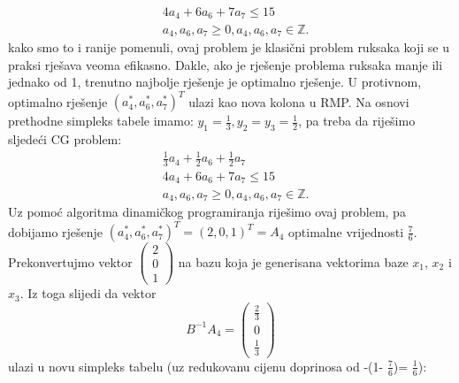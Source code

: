 \documentclass[a4paper, utf8, 11pt, colorlinks]{book}
\begin{document}
\begin{align}
   &	4 a_4 + 6 a_6 + 7 a_7 \leq 15 \\
   &	a_4, a_6, a_7 \geq 0, a_4, a_6, a_7 \in \mathbb{Z}.
\end{align}
kako smo to i ranije pomenuli, ovaj problem je klasični problem ruksaka koji se u praksi rješava veoma efikasno. Dakle, ako je rješenje problema ruksaka manje ili jednako od 1, trenutno najbolje rješenje je optimalno rješenje. U protivnom, optimalno rješenje $(a_4^*, a_6^*, a_7^*)^T$ ulazi kao nova kolona u RMP. Na osnovi prethodne simpleks tabele imamo: $y_1 = \frac{1}{3}, y_2 = y_3 = \frac{1}{2}$, pa treba da riješimo sljedeći CG problem:
\begin{align*}
      &\frac{1}{3} a_4 + \frac{1}{2} a_6 + \frac{1}{2} a_7 \\
      & 4 a_4 + 6 a_6 + 7 a_7 \leq 15 \\
      & 	a_4, a_6, a_7 \geq 0, a_4, a_6, a_7 \in \mathbb{Z}.
\end{align*}
Uz pomoć algoritma dinamičkog programiranja riješimo ovaj problem, pa dobijamo rješenje 
$(a_4^*, a_6^*, a_7^*)^T =  (2, 0, 1)^T=A_4$ optimalne vrijednosti $\frac{7}{6}$. Prekonvertujmo vektor $\begin{pmatrix}
	2\\
    0 \\
    1
\end{pmatrix}$
na bazu koja je generisana vektorima baze $x_1$, $x_2$ i $x_3$.  Iz toga slijedi da vektor 
$$ B^{-1}A_4 = \begin{pmatrix}
	  \frac{2}{3} \\
	  0           \\
	  \frac{1}{3}
\end{pmatrix}$$ ulazi u novu simpleks tabelu (uz redukovanu cijenu doprinosa od -(1- $\frac{7}{6}$)= $\frac{1}{6}$):
\end{document}
